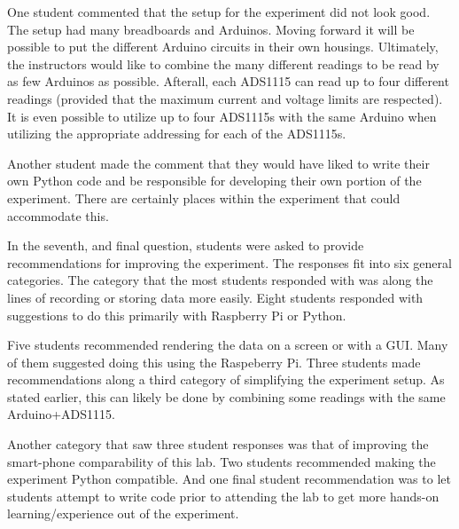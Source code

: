 One student commented that the setup for the experiment did not look good.
The setup had many breadboards and Arduinos.
Moving forward it will be possible to put the different Arduino circuits in their own housings.
Ultimately, the instructors would like to combine the many different readings to be read by as few Arduinos as possible.
Afterall, each ADS1115 can read up to four different readings (provided that the maximum current and voltage limits are respected).
It is even possible to utilize up to four ADS1115s with the same Arduino when utilizing the appropriate addressing for each of the ADS1115s.

Another student made the comment that they would have liked to write their own Python code and be responsible for developing their own portion of the experiment.
There are certainly places within the experiment that could accommodate this.

In the seventh, and final question, students were asked to provide recommendations for improving the experiment.
The responses fit into six general categories.
The category that the most students responded with was  along the lines of recording or storing data more easily.
Eight students responded with suggestions to do this primarily with Raspberry Pi or Python.

Five students recommended rendering the data on a screen or with a GUI.
Many of them suggested doing this using the Raspeberry Pi.
Three students made recommendations along a third category of simplifying the experiment setup.
As stated earlier, this can likely be done by combining some readings with the same Arduino+ADS1115.

Another category that saw three student responses was that of improving the smart-phone comparability of this lab.
Two students recommended making the experiment Python compatible.
And one final student recommendation was to let students attempt to write code prior to attending the lab to get more hands-on learning/experience out of the experiment.

